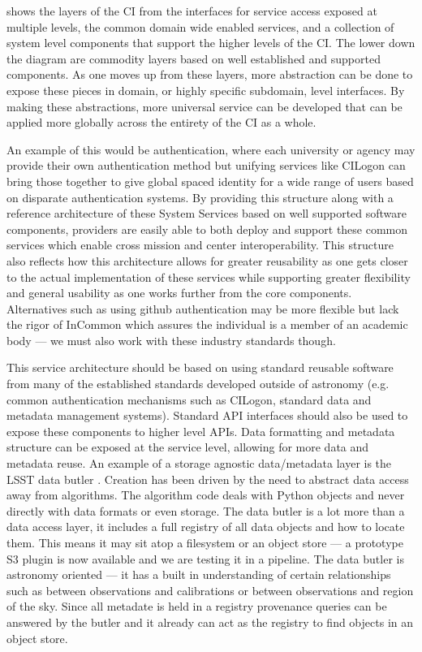  shows the
layers of the \gls{CI} from the interfaces for service access exposed
at multiple levels, the common domain wide enabled services, and a collection of system level components that support the
higher levels of the \gls{CI}.
The lower down the diagram are commodity layers based on well established and supported
components. As one moves up from these layers, more abstraction can be done to
expose these pieces in domain, or highly specific subdomain, level interfaces. By making these
abstractions, more universal service can be developed that can be applied more globally
across the entirety of the \gls{CI} as a whole.

An example of this would be
authentication, where each university or agency may provide their own authentication method
but unifying services like CILogon can bring those together to give global spaced
identity for a wide range of users based on disparate authentication systems.
By providing this structure along with a reference architecture of these System Services based on
well supported software components, providers are easily able to both deploy and support these common services which enable
cross mission and center interoperability. This structure also reflects how this architecture allows for greater reusability as one gets closer to the actual implementation of these
services while supporting greater flexibility and general usability as one works further from the core components.
Alternatives such as using github authentication may be more flexible but lack the
 rigor of InCommon which assures the individual is a member of an academic body --- we must also work with these industry standards though.

This service architecture should be based on using standard reusable software from many of the established standards developed outside of astronomy (e.g. common authentication mechanisms such as CILogon, standard data and \gls{metadata} management systems).  Standard \gls{API} interfaces should also be used to expose these components to higher level \gls{API}s. Data
formatting and \gls{metadata} structure can be exposed at the service level, allowing for
more data and \gls{metadata} reuse.
 An example of a storage agnostic data/metadata layer is the \gls{LSST} data butler \citep{2018arXiv181208085J}. Creation  has been driven by the need to abstract data access away from algorithms.
The \gls{algorithm} code deals with Python objects and never directly with data formats or even storage. The data butler is a lot more than a data access layer, it includes a full registry of all data objects and how to locate them. This means it may sit atop a filesystem or an object store --- a prototype S3 plugin is now available and we are testing it in a \gls{pipeline}.  The data butler is astronomy oriented --- it has a built in understanding of certain relationships such as between observations and calibrations or between observations and region of the sky. Since all metadate is held in a registry \gls{provenance} queries can be answered by the butler and it already can act as the registry to find objects in an object store.



